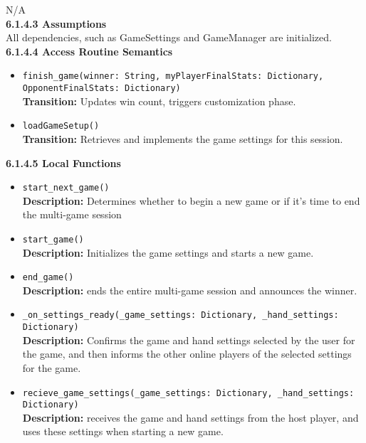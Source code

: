 \documentclass[12pt, titlepage]{article}
\begin{document}
N/A\\

\textbf{6.1.4.3 Assumptions}\\

All dependencies, such as GameSettings and GameManager are initialized.\\

\textbf{6.1.4.4 Access Routine Semantics}
\begin{itemize}

    \item \texttt{finish\_game(winner: String, myPlayerFinalStats: Dictionary, OpponentFinalStats: Dictionary)}\\
    \textbf{Transition:} Updates win count, triggers customization phase.
    
    \item \texttt{loadGameSetup()}\\
    \textbf{Transition:} Retrieves and implements the game settings for this session.

\end{itemize}

\textbf{6.1.4.5 Local Functions}
\begin{itemize}
    \item \texttt{start\_next\_game()}\\
	\textbf{Description:} Determines whether to begin a new game or if it's time to end the multi-game session 
    
    \item \texttt{start\_game()}\\
    \textbf{Description:} Initializes the game settings and starts a new game.
    
    \item \texttt{end\_game()}\\
    \textbf{Description:} ends the entire multi-game session and announces the winner.
    
    \item \texttt{\_on\_settings\_ready(\_game\_settings: Dictionary, \_hand\_settings: Dictionary)}\\
    \textbf{Description:} Confirms the game and hand settings selected by the user for the game, and then informs the other online players of the selected settings for the game.
    
    \item \texttt{recieve\_game\_settings(\_game\_settings: Dictionary, \_hand\_settings: Dictionary)}\\
    \textbf{Description:} receives the game and hand settings from the host player, and uses these settings when starting a new game.
    
\end{itemize}
\end{document}
